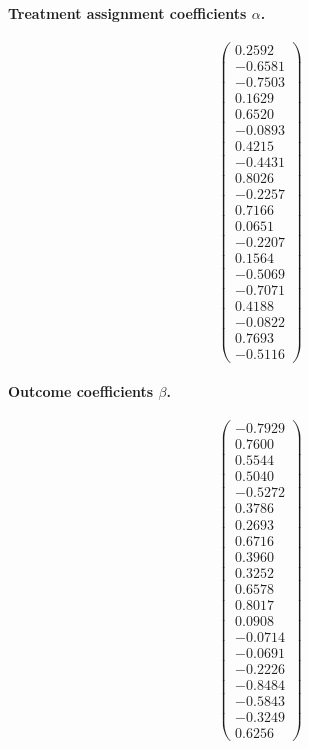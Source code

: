 \documentclass[accepted]{uai2026} %
\theoremstyle{plain}
\theoremstyle{definition}
\theoremstyle{remark}
\begin{document}
\vspace{0.5cm}
\noindent
\begin{minipage}[t]{0.48\textwidth}
  \paragraph{Treatment assignment coefficients $\alpha$.}
  \begin{equation*}
  \begin{pmatrix}
  0.2592 \\ -0.6581 \\ -0.7503 \\ 0.1629 \\ 0.6520 \\ -0.0893 \\ 0.4215 \\ -0.4431 \\ 0.8026 \\ -0.2257 \\
  0.7166 \\ 0.0651 \\ -0.2207 \\ 0.1564 \\ -0.5069 \\ -0.7071 \\ 0.4188 \\ -0.0822 \\ 0.7693 \\ -0.5116
  \end{pmatrix}
  \end{equation*}
\end{minipage}
\hfill
\begin{minipage}[t]{0.48\textwidth}
  \paragraph{Outcome coefficients $\beta$.}
  \begin{equation*}
  \begin{pmatrix}
  -0.7929 \\ 0.7600 \\ 0.5544 \\ 0.5040 \\ -0.5272 \\ 0.3786 \\ 0.2693 \\ 0.6716 \\ 0.3960 \\ 0.3252 \\
  0.6578 \\ 0.8017 \\ 0.0908 \\ -0.0714 \\ -0.0691 \\ -0.2226 \\ -0.8484 \\ -0.5843 \\ -0.3249 \\ 0.6256
  \end{pmatrix}
  \end{equation*}
\end{minipage}
\end{document}
